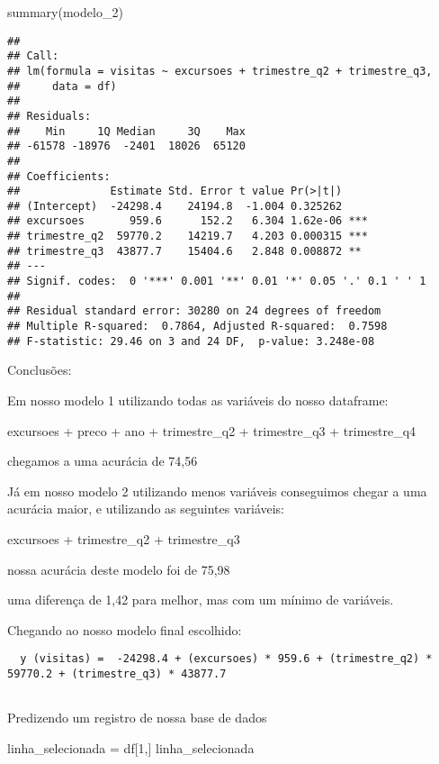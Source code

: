 \documentclass[
]{article}
\newenvironment{Shaded}{\begin{snugshade}}{\end{snugshade}}
\newcommand{\DecValTok}[1]{\textcolor[rgb]{0.00,0.00,0.81}{#1}}
\newcommand{\FunctionTok}[1]{\textcolor[rgb]{0.00,0.00,0.00}{#1}}
\newcommand{\NormalTok}[1]{#1}
\newcommand{\OtherTok}[1]{\textcolor[rgb]{0.56,0.35,0.01}{#1}}
\begin{document}
\begin{Shaded}
\begin{Highlighting}[]
\FunctionTok{summary}\NormalTok{(modelo\_2)}
\end{Highlighting}
\end{Shaded}

\begin{verbatim}
## 
## Call:
## lm(formula = visitas ~ excursoes + trimestre_q2 + trimestre_q3, 
##     data = df)
## 
## Residuals:
##    Min     1Q Median     3Q    Max 
## -61578 -18976  -2401  18026  65120 
## 
## Coefficients:
##              Estimate Std. Error t value Pr(>|t|)    
## (Intercept)  -24298.4    24194.8  -1.004 0.325262    
## excursoes       959.6      152.2   6.304 1.62e-06 ***
## trimestre_q2  59770.2    14219.7   4.203 0.000315 ***
## trimestre_q3  43877.7    15404.6   2.848 0.008872 ** 
## ---
## Signif. codes:  0 '***' 0.001 '**' 0.01 '*' 0.05 '.' 0.1 ' ' 1
## 
## Residual standard error: 30280 on 24 degrees of freedom
## Multiple R-squared:  0.7864, Adjusted R-squared:  0.7598 
## F-statistic: 29.46 on 3 and 24 DF,  p-value: 3.248e-08
\end{verbatim}

Conclusões:

Em nosso modelo 1 utilizando todas as variáveis do nosso dataframe:

excursoes + preco + ano + trimestre\_q2 + trimestre\_q3 + trimestre\_q4

chegamos a uma acurácia de 74,56

Já em nosso modelo 2 utilizando menos variáveis conseguimos chegar a uma
acurácia maior, e utilizando as seguintes variáveis:

excursoes + trimestre\_q2 + trimestre\_q3

nossa acurácia deste modelo foi de 75,98

uma diferença de 1,42 para melhor, mas com um mínimo de variáveis.

Chegando ao nosso modelo final escolhido:

\begin{verbatim}
  y (visitas) =  -24298.4 + (excursoes) * 959.6 + (trimestre_q2) * 59770.2 + (trimestre_q3) * 43877.7
  
\end{verbatim}

Predizendo um registro de nossa base de dados

\begin{Shaded}
\begin{Highlighting}[]
\NormalTok{linha\_selecionada }\OtherTok{=}\NormalTok{ df[}\DecValTok{1}\NormalTok{,]}
\NormalTok{linha\_selecionada}
\end{Highlighting}
\end{Shaded}
\end{document}
